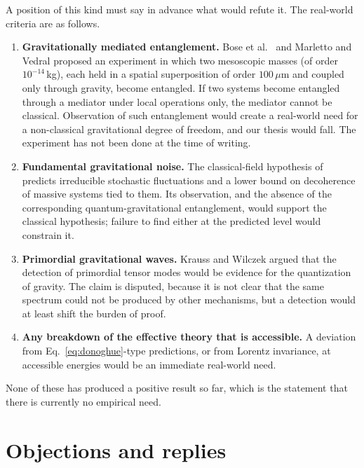 A position of this kind must say in advance what would refute it. The
real-world criteria are as follows.

\begin{enumerate}
\item \textbf{Gravitationally mediated entanglement.} Bose et
  al.\ \cite{qg:bose} and Marletto and Vedral \cite{qg:marletto} proposed
  an experiment in which two mesoscopic masses (of order $10^{-14}$\,kg),
  each held in a spatial superposition of order $100\,\mu\mathrm{m}$ and
  coupled only through gravity, become entangled. If two systems become
  entangled through a mediator under local operations only, the mediator
  cannot be classical. Observation of such entanglement would create a
  real-world need for a non-classical gravitational degree of freedom,
  and our thesis would fall. The experiment has not been done at the time
  of writing.
\item \textbf{Fundamental gravitational noise.} The classical-field
  hypothesis of \cite{qg:oppenheim} predicts irreducible stochastic
  fluctuations and a lower bound on decoherence of massive systems tied
  to them. Its observation, and the absence of the corresponding
  quantum-gravitational entanglement, would support the classical
  hypothesis; failure to find either at the predicted level would
  constrain it.
\item \textbf{Primordial gravitational waves.} Krauss and Wilczek
  \cite{qg:krauss} argued that the detection of primordial tensor
  modes would be evidence for the quantization of gravity. The claim is
  disputed, because it is not clear that the same spectrum could not be
  produced by other mechanisms, but a detection would at least shift the
  burden of proof.
\item \textbf{Any breakdown of the effective theory that is accessible.}
  A deviation from Eq.~\eqref{eq:donoghue}-type predictions, or from
  Lorentz invariance, at accessible energies would be an immediate real-world
  need.
\end{enumerate}

None of these has produced a positive result so far, which is the
statement that there is currently no empirical need.

\section{Objections and replies}


